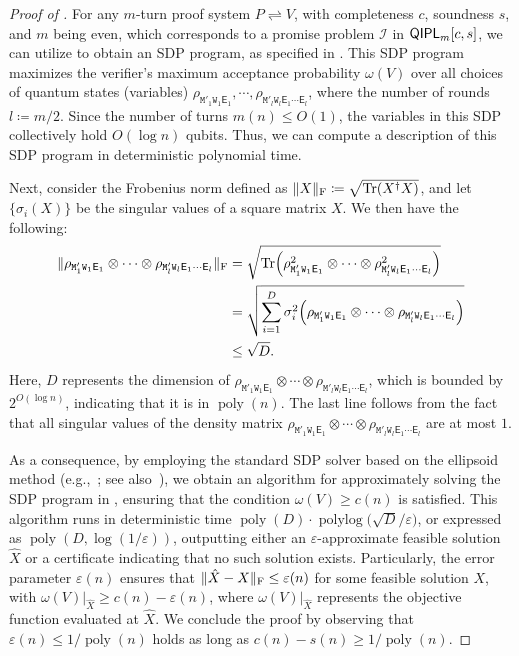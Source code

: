 \documentclass[11pt, a4paper]{article}
\numberwithin{equation}{section}
\numberwithin{figure}{section}
\newcommand{\QIPL}{\textnormal{\textsf{QIPL}}\xspace}
\newcommand{\protocol}[2]{{#1}\!\rightleftharpoons\!{#2}}
\DeclarePairedDelimiter\rbra{\lparen}{\rparen}
\DeclarePairedDelimiter\norm{\lVert}{\rVert}
\newcommand{\Tr}{\mathrm{Tr}}
\DeclareMathOperator\poly{poly}
\DeclareMathOperator\polylog{polylog}
\newcommand{\calI}{\mathcal{I}}
\newcommand{\sfE}{\mathsf{E}}
\newcommand{\ttM}{\mathtt{M}}
\newcommand{\ttW}{\mathtt{W}}
\begin{document}
\begin{proof}[Proof of ]
    For any $m$-turn proof system $\protocol{P}{V}$, with completeness $c$, soundness $s$, and $m$ being even, which corresponds to a promise problem $\calI$ in $\QIPL_m[c,s]$, we can utilize  to obtain an SDP program, as specified in .
    This SDP program maximizes the verifier's maximum acceptance probability $\omega(V)$ over all choices of quantum states (variables) $\rho_{\ttM'_1\ttW_1\sfE_1}, \cdots, \rho_{\ttM'_l\ttW_l\sfE_1\cdots\sfE_l}$, where the number of rounds $l \coloneqq m/2$. 
    Since the number of turns $m(n) \leq O(1)$, the variables in this SDP collectively hold $O(\log{n})$ qubits. Thus, we can compute a description of this SDP program in deterministic polynomial time. 
    
    Next, consider the Frobenius norm defined as $\norm{X}_{\rm F} \coloneqq \sqrt{\Tr\rbra*{X^\dagger X}}$, and let $\{\sigma_i(X)\}$ be the singular values of a square matrix $X$. We then have the following: 
    \begin{align*}
        \norm{ \rho_{\ttM'_1\ttW_1\sfE_1} \otimes \cdots \otimes \rho_{\ttM'_l\ttW_l\sfE_1\cdots\sfE_l} }_{\rm F} 
        &=\sqrt{\Tr\rbra*{\rho_{\ttM'_1\ttW_1\sfE_1}^2 \otimes \cdots \otimes \rho_{\ttM'_l\ttW_l\sfE_1\cdots\sfE_l}^2}}\\
        &=\sqrt{ \sum_{i=1}^D \sigma^2_i\rbra*{ \rho_{\ttM'_1\ttW_1\sfE_1} \otimes \cdots \otimes \rho_{\ttM'_l\ttW_l\sfE_1\cdots\sfE_l} } }\\
        &\leq \sqrt{D}. 
    \end{align*}
    Here, $D$ represents the dimension of $\rho_{\ttM'_1\ttW_1\sfE_1} \otimes \cdots \otimes \rho_{\ttM'_l\ttW_l\sfE_1\cdots\sfE_l}$, which is bounded by $2^{O(\log n)}$, indicating that it is in $\poly(n)$. The last line follows from the fact that all singular values of the density matrix $\rho_{\ttM'_1\ttW_1\sfE_1} \otimes \cdots \otimes \rho_{\ttM'_l\ttW_l\sfE_1\cdots\sfE_l}$ are at most $1$. 
    
    As a consequence, by employing the standard SDP solver based on the ellipsoid method  (e.g.,~\cite[Theorem 2.6.1]{GM12}; see also~\cite[Chapter 3]{GLS93}), we obtain an  algorithm for approximately solving the SDP program in , ensuring that the condition $\omega(V) \geq c(n)$ is satisfied. This algorithm runs in deterministic time $\poly(D) \cdot \polylog\big(\sqrt{D}/\varepsilon\big)$, or expressed as $\poly(D,\log(1/\varepsilon))$, outputting either an $\varepsilon$-approximate feasible solution $\hat{X}$ or a certificate indicating that no such solution exists. Particularly, the error parameter $\varepsilon(n)$ ensures that $\norm{\hat{X} - X}_{\rm F} \leq \varepsilon(n)$ for some feasible solution $X$, with $\omega(V)|_{\hat{X}} \geq c(n) - \varepsilon(n)$, where $\omega(V)|_{\hat{X}}$ represents the objective function evaluated at $\hat{X}$. 
    We conclude the proof by observing that $\varepsilon(n) \leq 1/\poly(n)$ holds as long as $c(n)-s(n) \geq 1/\poly(n)$. 
\end{proof}
\end{document}
